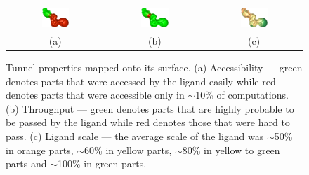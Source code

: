 \documentclass{svmult}
\newcommand{\tylde}{$\sim$}
\begin{document}
\begin{figure}
\centering
\begin{tabular}{ccc}
\includegraphics[width=0.3\textwidth]{fig/accessibility} &
\includegraphics[width=0.3\textwidth]{fig/throughput} &
\includegraphics[width=0.3\textwidth]{fig/ligand-scale} \\
  (a) & (b) & (c) \\                     
\end{tabular}
\caption{Tunnel properties mapped onto its surface.
(a) Accessibility --- green denotes parts that were accessed by the ligand easily while red denotes parts that were accessible only in \tylde 10\% of computations.
(b) Throughput --- green denotes parts that are highly probable to be passed by the ligand while red denotes those that were hard to pass.
(c) Ligand scale --- the average scale of the ligand was \tylde 50\% in orange parts, \tylde 60\% in yellow parts, \tylde 80\% in yellow to green parts and \tylde 100\% in green parts.
\label{fig:properties}
}
\end{figure}

\def\cstart{\overline{c_{start}}}
\def\cend{\overline{c_{end}}}
\end{document}
